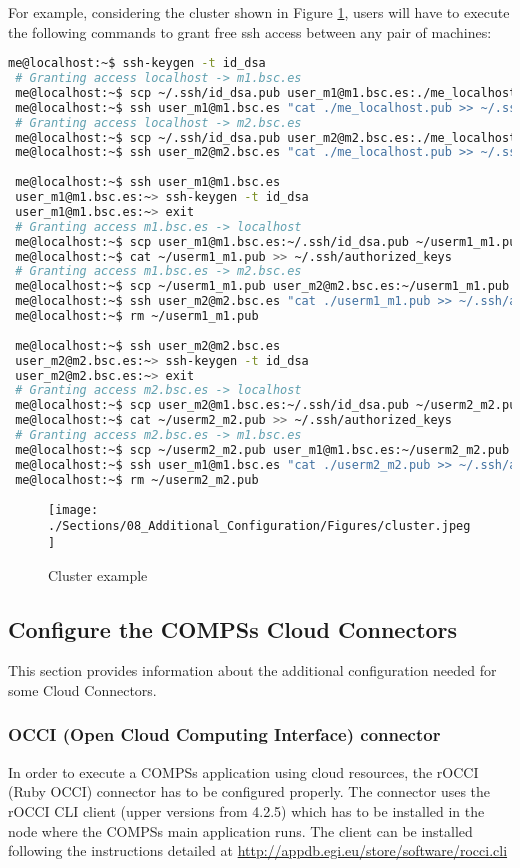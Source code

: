 For example, considering the cluster shown in Figure \ref{fig:cluster}, users will have to execute the following commands
to grant free ssh access between any pair of machines:
\begin{lstlisting}[language=bash]
 me@localhost:~$ ssh-keygen -t id_dsa
 # Granting access localhost -> m1.bsc.es
 me@localhost:~$ scp ~/.ssh/id_dsa.pub user_m1@m1.bsc.es:./me_localhost.pub
 me@localhost:~$ ssh user_m1@m1.bsc.es "cat ./me_localhost.pub >> ~/.ssh/authorized_keys; rm ./me_localhost.pub"
 # Granting access localhost -> m2.bsc.es
 me@localhost:~$ scp ~/.ssh/id_dsa.pub user_m2@m2.bsc.es:./me_localhost.pub
 me@localhost:~$ ssh user_m2@m2.bsc.es "cat ./me_localhost.pub >> ~/.ssh/authorized_keys; rm ./me_localhost.pub"
 
 me@localhost:~$ ssh user_m1@m1.bsc.es
 user_m1@m1.bsc.es:~> ssh-keygen -t id_dsa
 user_m1@m1.bsc.es:~> exit
 # Granting access m1.bsc.es -> localhost
 me@localhost:~$ scp user_m1@m1.bsc.es:~/.ssh/id_dsa.pub ~/userm1_m1.pub
 me@localhost:~$ cat ~/userm1_m1.pub >> ~/.ssh/authorized_keys
 # Granting access m1.bsc.es -> m2.bsc.es
 me@localhost:~$ scp ~/userm1_m1.pub user_m2@m2.bsc.es:~/userm1_m1.pub 
 me@localhost:~$ ssh user_m2@m2.bsc.es "cat ./userm1_m1.pub >> ~/.ssh/authorized_keys; rm ./userm1_m1.pub"
 me@localhost:~$ rm ~/userm1_m1.pub
 
 me@localhost:~$ ssh user_m2@m2.bsc.es
 user_m2@m2.bsc.es:~> ssh-keygen -t id_dsa
 user_m2@m2.bsc.es:~> exit
 # Granting access m2.bsc.es -> localhost
 me@localhost:~$ scp user_m2@m1.bsc.es:~/.ssh/id_dsa.pub ~/userm2_m2.pub
 me@localhost:~$ cat ~/userm2_m2.pub >> ~/.ssh/authorized_keys
 # Granting access m2.bsc.es -> m1.bsc.es
 me@localhost:~$ scp ~/userm2_m2.pub user_m1@m1.bsc.es:~/userm2_m2.pub 
 me@localhost:~$ ssh user_m1@m1.bsc.es "cat ./userm2_m2.pub >> ~/.ssh/authorized_keys; rm ./userm2_m2.pub"
 me@localhost:~$ rm ~/userm2_m2.pub
\end{lstlisting}

\begin{figure}[h!]
  \centering
    \texttt{[image: ./Sections/08\_Additional\_Configuration/Figures/cluster.jpeg]}
    \caption{Cluster example}
    \label{fig:cluster}
\end{figure}


\subsection{Configure the COMPSs Cloud Connectors}
This section provides information about the additional configuration needed for some Cloud Connectors.

\subsubsection{OCCI (Open Cloud Computing Interface) connector}
In order to execute a COMPSs application using cloud resources, the rOCCI (Ruby OCCI) connector has to be configured properly.
The connector uses the rOCCI CLI client (upper versions from 4.2.5) which has to be installed in the node where the COMPSs main
application runs. The client can be installed following the instructions detailed at 
\url{http://appdb.egi.eu/store/software/rocci.cli}